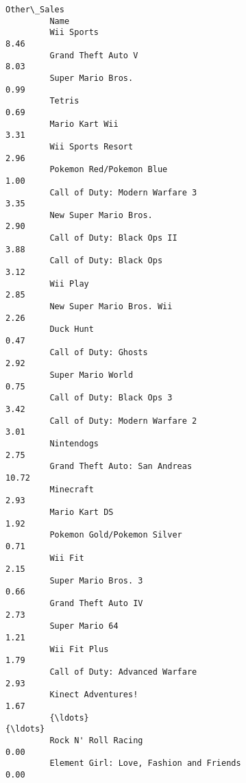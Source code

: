 \documentclass[11pt]{article}
\begin{document}
\begin{Verbatim}[commandchars=\\\{\}]
                                                             Other\_Sales  
         Name                                                             
         Wii Sports                                                 8.46  
         Grand Theft Auto V                                         8.03  
         Super Mario Bros.                                          0.99  
         Tetris                                                     0.69  
         Mario Kart Wii                                             3.31  
         Wii Sports Resort                                          2.96  
         Pokemon Red/Pokemon Blue                                   1.00  
         Call of Duty: Modern Warfare 3                             3.35  
         New Super Mario Bros.                                      2.90  
         Call of Duty: Black Ops II                                 3.88  
         Call of Duty: Black Ops                                    3.12  
         Wii Play                                                   2.85  
         New Super Mario Bros. Wii                                  2.26  
         Duck Hunt                                                  0.47  
         Call of Duty: Ghosts                                       2.92  
         Super Mario World                                          0.75  
         Call of Duty: Black Ops 3                                  3.42  
         Call of Duty: Modern Warfare 2                             3.01  
         Nintendogs                                                 2.75  
         Grand Theft Auto: San Andreas                             10.72  
         Minecraft                                                  2.93  
         Mario Kart DS                                              1.92  
         Pokemon Gold/Pokemon Silver                                0.71  
         Wii Fit                                                    2.15  
         Super Mario Bros. 3                                        0.66  
         Grand Theft Auto IV                                        2.73  
         Super Mario 64                                             1.21  
         Wii Fit Plus                                               1.79  
         Call of Duty: Advanced Warfare                             2.93  
         Kinect Adventures!                                         1.67  
         {\ldots}                                                         {\ldots}  
         Rock N' Roll Racing                                        0.00  
         Element Girl: Love, Fashion and Friends                    0.00  

\end{Verbatim}
\end{document}
